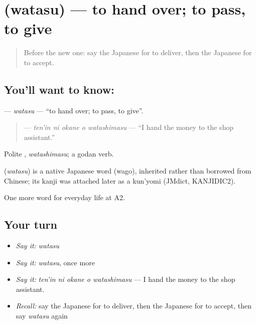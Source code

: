 \section[\texorpdfstring{\ja{わたす} (watasu)}{わたす (watasu)}]{ (watasu) — to hand over; to pass, to give}

\label{lesson:JA-C189-watasu}



\begin{quote}
Before the new one: say the Japanese for to deliver, then the Japanese for to accept.
\end{quote}

\subsection*{You'll want to know: }
\textbf{} — \emph{watasu} — \textquotedblleft{}to hand over; to pass, to give\textquotedblright{}.

\begin{quote}
\textbf{  } — \emph{ten'in ni okane o watashimasu} — \textquotedblleft{}I hand the money to the shop assistant.\textquotedblright{}
\end{quote}

Polite \textbf{}, \emph{watashimasu}; a godan verb.

\begin{cousinweb}
\textbf{} (\emph{watasu}) is a native Japanese word (wago), inherited rather than borrowed from Chinese; its kanji was attached later as a kun'yomi (JMdict, KANJIDIC2).
\end{cousinweb}

\begin{grammarlens}[title={What you've built}]
One more word for everyday life at A2.
\end{grammarlens}

\subsection*{Your turn}
\begin{itemize}
\raggedright
  \item \emph{Say it:} \emph{watasu}
  \item \emph{Say it:} \emph{watasu}, once more
  \item \emph{Say it:} \emph{ten'in ni okane o watashimasu} — I hand the money to the shop assistant.
  \item \emph{Recall:} say the Japanese for to deliver, then the Japanese for to accept, then say \emph{watasu} again
\end{itemize}

